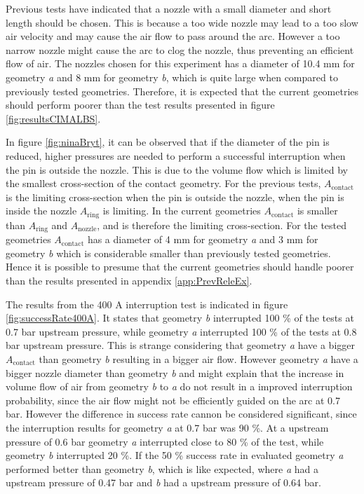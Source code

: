\documentclass[10pt,a4paper,twoside]{article}
\begin{document}
Previous tests have indicated that a nozzle with a small diameter and short length should be chosen. This is because a too wide nozzle may lead to a too slow air velocity and may cause the air flow to pass around the arc. However a too narrow nozzle might cause the arc to clog the nozzle, thus preventing an efficient flow of air. The nozzles chosen for this experiment has a diameter of  10.4 mm for geometry \textit{a} and 8 mm for geometry \textit{b}, which is quite large when compared to previously tested geometries. Therefore, it is expected that the current geometries should perform poorer than the test results presented in figure \ref{fig:resultsCIMALBS}.

In figure \ref{fig:ninaBryt}, it can be observed that if the diameter of the pin is reduced, higher pressures are needed to perform a successful interruption when the pin is outside the nozzle. This is due to the volume flow which is limited by the smallest cross-section of the contact geometry. For the previous tests, $A_\mathrm{{contact}}$ is the limiting cross-section when the pin is outside the nozzle, when the pin is inside the nozzle $A_\mathrm{{ring}}$ is limiting. In the current geometries $A_\mathrm{{contact}}$ is smaller than $A_\mathrm{{ring}}$ and $A_\mathrm{{nozzle}}$, and is therefore the limiting cross-section. For the tested geometries $A_\mathrm{{contact}}$ has a diameter of 4 mm for geometry \textit{a} and 3 mm for geometry \textit{b} which is considerable smaller than previously tested geometries. Hence it is possible to presume that the current geometries should handle poorer than the results presented in appendix \ref{app:PrevReleEx}.

The results from the 400 A interruption test is indicated in figure \ref{fig:successRate400A}. It states that geometry \textit{b} interrupted 100 \% of the tests at 0.7 bar upstream pressure, while geometry \textit{a} interrupted 100 \% of the tests at 0.8 bar upstream pressure. This is strange considering that geometry \textit{a} have a bigger $A_\mathrm{{contact}}$ than geometry \textit{b} resulting in a bigger air flow. However geometry \textit{a} have a bigger nozzle diameter than geometry \textit{b} and might explain that the increase in volume flow of air from geometry \textit{b} to \textit{a} do not result in a improved interruption probability, since the air flow might not be efficiently guided on the arc at 0.7 bar. However the difference in success rate cannon be considered significant, since the interruption results for geometry \textit{a} at 0.7 bar was 90 \%. At a upstream pressure of 0.6 bar geometry \textit{a} interrupted close to 80 \% of the test, while geometry \textit{b} interrupted 20 \%. If the 50 \% success rate in evaluated geometry \textit{a} performed better than geometry \textit{b}, which is like expected, where \textit{a} had a upstream pressure of 0.47 bar and \textit{b} had a upstream pressure of 0.64 bar.
\end{document}
